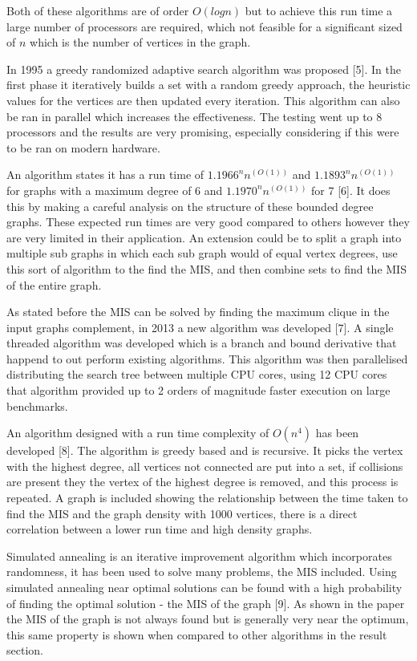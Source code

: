 \documentclass[conference]{IEEEtran}
\begin{document}
Both of these algorithms are of order $O(logn)$ but to achieve this run time a large number of processors are required,
which not feasible for a significant sized of $n$ which is the number of vertices in the graph.

In 1995 a greedy randomized adaptive search algorithm was proposed [5]. In the first phase it iteratively builds a set 
with a random greedy approach, the heuristic values for the vertices are then updated every iteration. This algorithm
can also be ran in parallel which increases the effectiveness. The testing went up to 8 processors and the results are
very promising, especially considering if this were to be ran on modern hardware.

An algorithm states it has a run time of $1.1966^n n^(O(1))$ and $1.1893^n n^(O(1))$ for graphs with a maximum degree
of 6 and $1.1970^n n^(O(1))$ for 7 [6]. It does this by making a careful analysis on the structure of these bounded degree
graphs. These expected run times are very good compared to others however they are very limited in their application.
An extension could be to split a graph into multiple sub graphs in which each sub graph would of equal vertex degrees,
use this sort of algorithm to the find the MIS, and then combine sets to find the MIS of the entire graph.

As stated before the MIS can be solved by finding the maximum clique in the input graphs complement, in 2013 a new 
algorithm was developed [7]. A single threaded algorithm was developed which is a branch and bound derivative that 
happend to out perform existing algorithms. This algorithm was then parallelised distributing the search tree between
multiple CPU cores, using 12 CPU cores that algorithm provided up to 2 orders of magnitude faster execution on large
benchmarks.

An algorithm designed with a run time complexity of $O(n^4)$ has been developed [8]. The algorithm is greedy based and 
is recursive. It picks the vertex with the highest degree, all vertices not connected are put into a set, if collisions
are present they the vertex of the highest degree is removed, and this process is repeated. A graph is included showing
the relationship between the time taken to find the MIS and the graph density with 1000 vertices, there is a direct 
correlation between a lower run time and high density graphs.

Simulated annealing is an iterative improvement algorithm which incorporates randomness, it has been used to solve many
problems, the MIS included. Using simulated annealing near optimal solutions can be found with a high probability of 
finding the optimal solution - the MIS of the graph [9]. As shown in the paper the MIS of the graph is not always found
but is generally very near the optimum, this same property is shown when compared to other algorithms in the result 
section.
\end{document}
